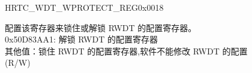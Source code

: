 \begin{register}{H}{RTC\_WDT\_WPROTECT\_REG}{0x0018}\label{regdesc:RTCWDTWPROTECTREG}
%
\regnewline%
\begin{regdesc}\begin{reglist}
\label{fielddesc:RTCWDTWKEY}\item [RTC\_WDT\_WKEY] 配置该寄存器来锁住或解锁 RWDT 的配置寄存器。\\
0x50D83AA1: 解锁 RWDT 的配置寄存器 \\
其他值：锁住 RWDT 的配置寄存器,软件不能修改 RWDT 的配置 \\
 (R/W)
\end{reglist}\end{regdesc}
\end{register}


